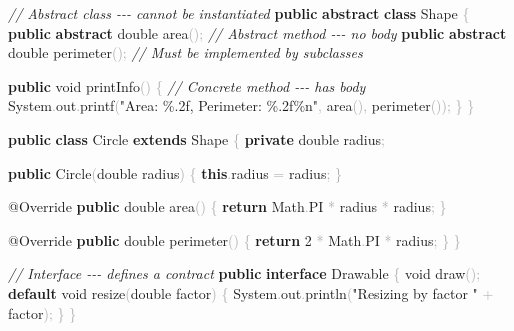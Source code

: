 \documentclass[
  justified,
  openright,
]{tufte-book}
\newcommand{\KeywordTok}[1]{\textcolor{CodeKeyword}{\textbf{#1}}}  %
\newcommand{\StringTok}[1]{\textcolor{CodeString}{#1}}              %
\newcommand{\CommentTok}[1]{\textcolor{CodeComment}{\textit{#1}}}  %
\newcommand{\CodeNumTok}[1]{\textcolor{CodeNumber}{#1}}             %
\newcommand{\CodeFuncTok}[1]{\textcolor{CodeKeyword}{#1}}           %
\newcommand{\CodeTypeTok}[1]{\textcolor{CodeType}{#1}}              %
\newcommand{\OperatorTok}[1]{\textcolor{DarkGray}{#1}}              %
\newenvironment{Shaded}{%
  \begin{mdframed}[style=TufteCode]%
}{%
  \end{mdframed}%
}
\begin{document}
\begin{Shaded}
\begin{Highlighting}[]
\CommentTok{// Abstract class {-}{-}{-} cannot be instantiated}
\KeywordTok{public} \KeywordTok{abstract} \KeywordTok{class} Shape \OperatorTok{\{}
    \KeywordTok{public} \KeywordTok{abstract} \CodeTypeTok{double} \CodeFuncTok{area}\OperatorTok{();}      \CommentTok{// Abstract method {-}{-}{-} no body}
    \KeywordTok{public} \KeywordTok{abstract} \CodeTypeTok{double} \CodeFuncTok{perimeter}\OperatorTok{();} \CommentTok{// Must be implemented by subclasses}
 
    \KeywordTok{public} \CodeTypeTok{void} \CodeFuncTok{printInfo}\OperatorTok{()} \OperatorTok{\{}           \CommentTok{// Concrete method {-}{-}{-} has body}
        System\OperatorTok{.}\CodeFuncTok{out}\OperatorTok{.}\CodeFuncTok{printf}\OperatorTok{(}\StringTok{"Area: }\StringTok{\%.2f}\StringTok{, Perimeter: }\StringTok{\%.2f\%n}\StringTok{"}\OperatorTok{,} \CodeFuncTok{area}\OperatorTok{(),} \CodeFuncTok{perimeter}\OperatorTok{());}
    \OperatorTok{\}}
\OperatorTok{\}}
 
\KeywordTok{public} \KeywordTok{class} Circle \KeywordTok{extends} Shape \OperatorTok{\{}
    \KeywordTok{private} \CodeTypeTok{double} radius\OperatorTok{;}
 
    \KeywordTok{public} \CodeFuncTok{Circle}\OperatorTok{(}\CodeTypeTok{double} radius\OperatorTok{)} \OperatorTok{\{} \KeywordTok{this}\OperatorTok{.}\CodeFuncTok{radius} \OperatorTok{=} radius\OperatorTok{;} \OperatorTok{\}}
 
    \CodeTypeTok{@Override}
    \KeywordTok{public} \CodeTypeTok{double} \CodeFuncTok{area}\OperatorTok{()} \OperatorTok{\{} \KeywordTok{return} Math\OperatorTok{.}\CodeFuncTok{PI} \OperatorTok{*} radius \OperatorTok{*} radius\OperatorTok{;} \OperatorTok{\}}
 
    \CodeTypeTok{@Override}
    \KeywordTok{public} \CodeTypeTok{double} \CodeFuncTok{perimeter}\OperatorTok{()} \OperatorTok{\{} \KeywordTok{return} \CodeNumTok{2} \OperatorTok{*} Math\OperatorTok{.}\CodeFuncTok{PI} \OperatorTok{*} radius\OperatorTok{;} \OperatorTok{\}}
\OperatorTok{\}}
 
\CommentTok{// Interface {-}{-}{-} defines a contract}
\KeywordTok{public} \KeywordTok{interface} Drawable \OperatorTok{\{}
    \CodeTypeTok{void} \CodeFuncTok{draw}\OperatorTok{();}
    \KeywordTok{default} \CodeTypeTok{void} \CodeFuncTok{resize}\OperatorTok{(}\CodeTypeTok{double} factor\OperatorTok{)} \OperatorTok{\{}
        System\OperatorTok{.}\CodeFuncTok{out}\OperatorTok{.}\CodeFuncTok{println}\OperatorTok{(}\StringTok{"Resizing by factor "} \OperatorTok{+} factor\OperatorTok{);}
    \OperatorTok{\}}
\OperatorTok{\}}
\end{Highlighting}
\end{Shaded}
\end{document}
